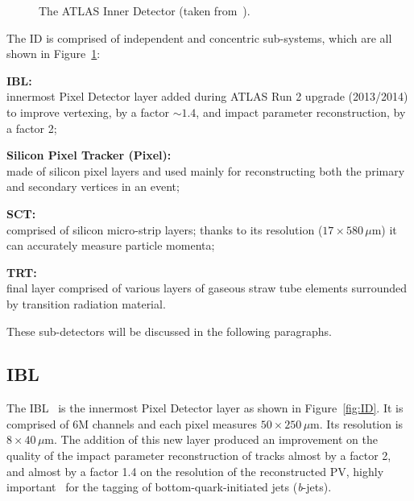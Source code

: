 			\begin{figure}[!htb]
				\hfill
				\caption{The \ac{ATLAS} Inner Detector (taken from~\cite{ATLASPhotos}).}
				\label{fig:AID}
			\end{figure}


			The \ac{ID} is comprised of independent and concentric sub-systems, which are all shown in Figure~\ref{fig:AID}: %

			\begin{description}
				\item \textbf{\ac{IBL}:} \\innermost Pixel Detector layer added during \ac{ATLAS} Run 2 upgrade (2013/2014) to improve vertexing, by a factor $\sim 1.4$, and impact parameter reconstruction, by a factor 2;
				\item \textbf{Silicon Pixel Tracker (Pixel):} \\made of silicon pixel layers and used mainly for reconstructing both the primary and secondary vertices in an event;
				\item \textbf{\ac{SCT}:} \\comprised of silicon micro-strip layers; thanks to its resolution ($17 \times 580\, \mu$m) it can accurately measure particle momenta;
				\item \textbf{\ac{TRT}:} \\final layer comprised of various layers of gaseous straw tube elements surrounded by transition radiation material.
			\end{description}

			These sub-detectors will be discussed in the following paragraphs.  

			\subsection*{IBL} 
				
				The \ac{IBL}~\cite{IBLTDR} is the innermost Pixel Detector layer as shown in Figure~\ref{fig:ID}. It is comprised of 6M channels and each pixel measures $50 \times 250\,\mu$m. Its resolution is $8 \times 40\, \mu$m. The addition of this new layer produced an improvement on the quality of the impact parameter reconstruction of tracks almost by a factor 2, and almost by a factor 1.4 on the resolution of the reconstructed \ac{PV}, highly important \eg\ for the tagging of bottom-quark-initiated jets (\emph{b}-jets). %

